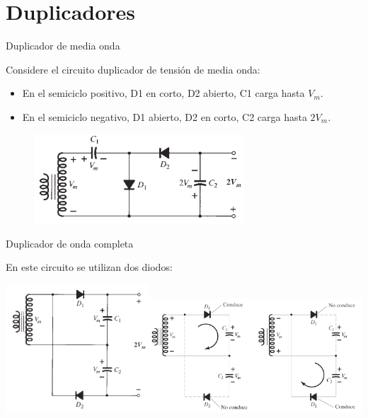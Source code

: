 \documentclass[t,aspectratio=169]{beamer}
\begin{document}
\section{Duplicadores}
\begin{frame}{Duplicador de media onda}

Considere el circuito duplicador de tensión de media onda:

\begin{itemize}
    \item En el semiciclo positivo, D1 en corto, D2 abierto, C1 carga hasta $V_m$.
    \item En el semiciclo negativo, D1 abierto, D2 en corto, C2 carga hasta $2V_m$.
\end{itemize}

\begin{figure}
    \centering
    \includegraphics[width=0.7\textwidth]{figures/duplicador_1.png}
\end{figure}

\end{frame}


\begin{frame}{Duplicador de onda completa}

En este circuito se utilizan dos diodos:

\vspace{5mm}
\includegraphics[width=0.4\textwidth]{figures/duplicador_onda_completa_1.png}\includegraphics[width=0.6\textwidth]{figures/duplicador_onda_completa_2.png}

\end{frame}
\end{document}
